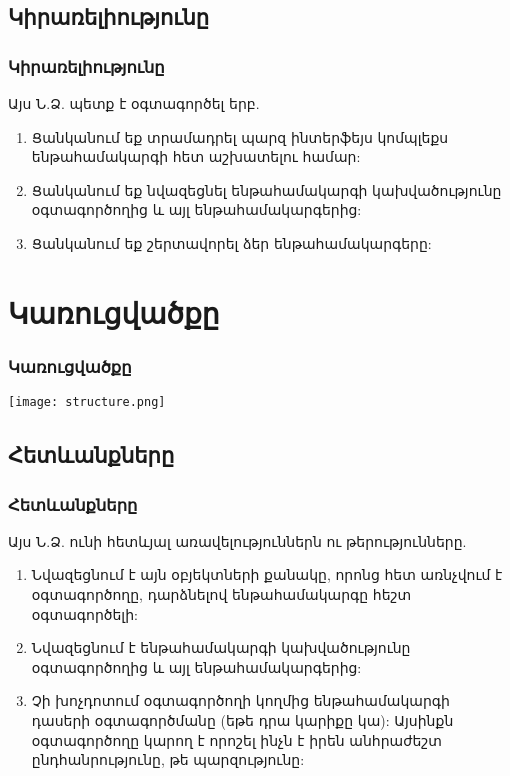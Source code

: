 \documentclass{beamer}
\begin{document}
\subsection{Կիրառելիությունը}
\begin{frame}\frametitle{Կիրառելիությունը}
Այս Ն.Ձ. պետք է օգտագործել երբ.
\vfill
\begin{enumerate}
    \item Ցանկանում եք տրամադրել պարզ ինտերֆեյս կոմպլեքս ենթահամակարգի
    հետ աշխատելու համար: \pause \vfill
    \item Ցանկանում եք նվազեցնել ենթահամակարգի կախվածությունը օգտագործողից
    և այլ ենթահամակարգերից: \pause \vfill
    \item Ցանկանում եք շերտավորել ձեր ենթահամակարգերը:
\end{enumerate}
\end{frame}

\section{Կառուցվածքը}
\begin{frame}\frametitle{Կառուցվածքը}
\begin{center}
    \texttt{[image: structure.png]}
\end{center}
\end{frame}

\subsection{Հետևանքները}
\begin{frame}\frametitle{Հետևանքները}
Այս Ն.Ձ. ունի հետևյալ առավելություններն ու թերությունները.
\vfill
\begin{enumerate}
    \item Նվազեցնում է այն օբյեկտների քանակը, որոնց հետ առնչվում է օգտագործողը,
    դարձնելով ենթահամակարգը հեշտ օգտագործելի: \pause \vfill
    \item Նվազեցնում է ենթահամակարգի կախվածությունը օգտագործողից և այլ
    ենթահամակարգերից: \pause \vfill
    \item Չի խոչդոտում օգտագործողի կողմից ենթահամակարգի դասերի օգտագործմանը
    (եթե դրա կարիքը կա): Այսինքն օգտագործողը կարող է որոշել ինչն է իրեն անհրաժեշտ
    ընդհանրությունը, թե պարզությունը:
\end{enumerate}
\end{frame}
\end{document}
